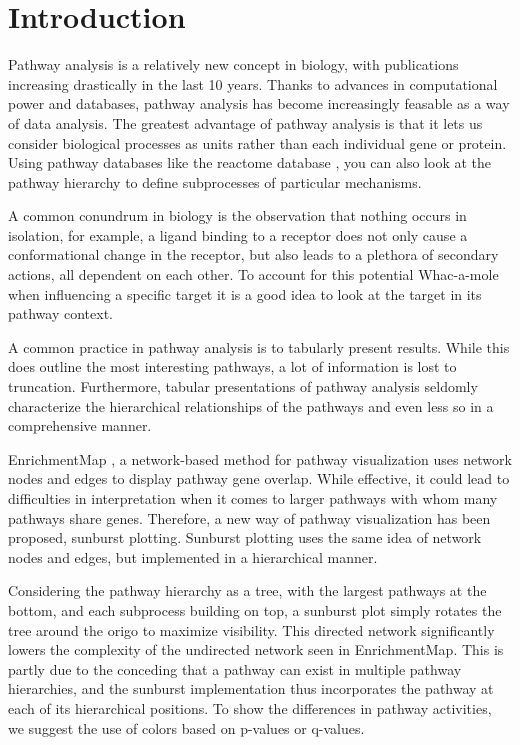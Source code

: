 \documentclass[11pt]{article}
\begin{document}
\maketitle


\begin{abstract}

\end{abstract}

\section*{Introduction}
  Pathway analysis is a relatively new concept in biology, with publications increasing drastically in the last 10 years. Thanks to advances in computational power and databases, pathway analysis has become increasingly feasable as a way of data analysis. The greatest advantage of pathway analysis is that it lets us consider biological processes as units rather than each individual gene or protein. Using pathway databases like the reactome database \cite{reactome}, you can also look at the pathway hierarchy to define subprocesses of particular mechanisms.

  A common conundrum in biology is the observation that nothing occurs in isolation, for example, a ligand binding to a receptor does not only cause a conformational change in the receptor, but also leads to a plethora of secondary actions, all dependent on each other. To account for this potential Whac-a-mole when influencing a specific target it is a good idea to look at the target in its pathway context.

  A common practice in pathway analysis is to tabularly present results. While this does outline the most interesting pathways, a lot of information is lost to truncation. Furthermore, tabular presentations of pathway analysis seldomly characterize the hierarchical relationships of the pathways and even less so in a comprehensive manner.

  EnrichmentMap \cite{enrichmentmap}, a network-based method for pathway visualization uses network nodes and edges to display pathway gene overlap. While effective, it could lead to difficulties in interpretation when it comes to larger pathways with whom many pathways share genes. Therefore, a new way of pathway visualization has been proposed, sunburst plotting. Sunburst plotting uses the same idea of network nodes and edges, but implemented in a hierarchical manner.

  Considering the pathway hierarchy as a tree, with the largest pathways at the bottom, and each subprocess building on top, a sunburst plot simply rotates the tree around the origo to maximize visibility. This directed network significantly lowers the complexity of the undirected network seen in EnrichmentMap. This is partly due to the conceding that a pathway can exist in multiple pathway hierarchies, and the sunburst implementation thus incorporates the pathway at each of its hierarchical positions. To show the differences in pathway activities, we suggest the use of colors based on p-values or q-values.
\end{document}
